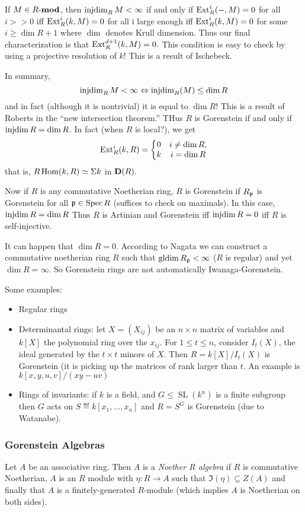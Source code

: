 \documentclass[12pt]{article}
\begin{document}
If $M\in R\text{-}\mathbf{mod}$, then $\operatorname{injdim}_R M<\infty$ if and only if $\operatorname{Ext}_R^i(-,M)=0$ for all $i>>0$ iff $\operatorname{Ext}_R^i(k,M)=0$ for all i large enough iff $\operatorname{Ext}_R^i(k,M)=0$ for some $i\ge \dim R+1$ where $\dim$ denotes Krull dimension. Thus our final characterization is that $\operatorname{Ext}_R^{d+1}(k,M)=0.$
This condition is easy to check by using a projective resolution of $k$! This is a result of Ischebeck.

In summary,
\[\operatorname{injdim}_R M<\infty \Leftrightarrow \operatorname{injdim}_R(M)\le \dim R\]
and in fact (although it is nontrivial) it is equal to $\dim R!$ This is a result of Roberts in the ``new intersection theorem.'' THus $R$ is Gorenstein if and only if $\operatorname{injdim} R=\dim R$. In fact (when $R$ is local?), we get 
\[\operatorname{Ext}_R^i(k,R)=\left\{\begin{matrix}
0 & i\ne\dim R,\\
k & i=\dim R
\end{matrix}\right.\]
that is, $R\operatorname{Hom}(k,R)\simeq \Sigma k$ in $\mathbf{D}(R).$

Now if $R$ is any commutative Noetherian ring, $R$ is Gorenstein if $R_{\mathfrak{p}}$ is Gorenstein for all $\mathfrak{p}\in\operatorname{Spec} R$ (suffices to check on maximals).
In this case, $\operatorname{injdim} R=\dim R$ Thus $R$ is Artinian and Gorenstein iff $\operatorname{injdim} R=0$ iff $R$ is self-injective.

It can happen that $\dim R=0$. According to Nagata we can construct a commutative noetherian ring $R$ such that $\operatorname{gldim} R_{\mathfrak{p}}<\infty$ ($R$ is regular) and yet $\dim R=\infty.$ So Gorenstein rings are not automatically Iwanaga-Gorenstein.

Some examples: 
\begin{itemize}
    \item Regular rings
    \item Determinantal rings: let $X=(X_{ij})$ be an $n\times n$ matrix of variables and $k[X]$ the polynomial ring over the $x_{ij}.$ For $1\le t\le n$, consider $I_t(X)$, the ideal generated by the $t\times t$ minors of $X$. Then $R=k[X]/I_t(X)$ is Gorenstein (it is picking up the matrices of rank larger than $t$. An example is $k[x,y,u,v]/(xy-uv)$
    \item Rings of invariants: if $k$ is a field, and $G\le \operatorname{SL}(k^n)$ is a finite subgroup then $G$ acts on $S\eqdef k[x_1,\dots,x_n]$ and $R=S^G$ is Gorenstein (due to Watanabe).
\end{itemize}
\subsubsection{Gorenstein Algebras}
Let $A$ be an associative ring. Then $A$ is a \emph{Noether $R$ algebra} if $R$ is commutative Noetherian, $A$ is an $R$ module with $\eta:R\to A$ such that $\Im(\eta)\subseteq Z(A)$ and finally that $A$ is a finitely-generated $R$-module (which implies $A$ is Noetherian on both sides).
\end{document}
